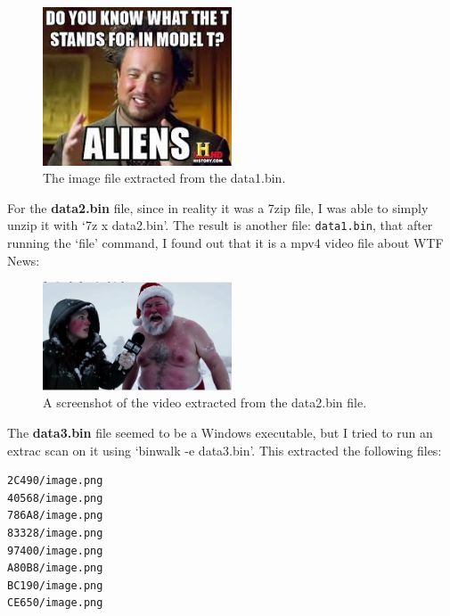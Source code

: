\documentclass[pdflatex,sn-mathphys-num]{sn-jnl}
\begin{document}
\begin{figure}[htbp]
    \centering
    \includegraphics[width=0.5\textwidth]{images/data1_data2.bin.png}
    \caption{The image file extracted from the data1.bin.}
    \label{fig:data1_data2}
\end{figure}

\par For the \textbf{data2.bin} file, since in reality it was a 7zip file, I was able to simply unzip it with
`7z x data2.bin'. The result is another file: \texttt{data1.bin}, that after running the `file' command, I found out
that it is a mpv4 video file about WTF News:

\begin{figure}[htbp]
    \centering
    \includegraphics[width=0.5\textwidth]{images/data2.png}
    \caption{A screenshot of the video extracted from the data2.bin file.}
    \label{fig:data2}
\end{figure}

\par The \textbf{data3.bin} file seemed to be a Windows executable, but I tried to run an extrac scan on it using
`binwalk -e data3.bin'. This extracted the following files:

\begin{lstlisting}[style=fileresultstyle]
2C490/image.png
40568/image.png
786A8/image.png
83328/image.png
97400/image.png
A80B8/image.png
BC190/image.png
CE650/image.png
\end{lstlisting}
\end{document}
